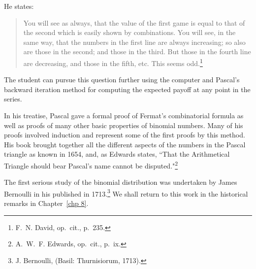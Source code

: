 \noindent He states:
\begin{quote}
\indent You will see as always, that the value of the first game is equal to that of
the second which is easily shown by combinations.  You will see, in the same way, that
the numbers in the first line are always increasing; so also are those in the second;
and those in the third.  But those in the fourth line are decreasing, and those in the
fifth, etc.  This seems odd.\footnote{F.\ N. David, op.\ cit., p.~235.}
\end{quote}
\par The student can pursue this question further using the computer and Pascal's
backward iteration method for computing the expected payoff at any point in the series.
\par In his treatise, Pascal gave a formal proof of Fermat's combinatorial formula as
well as proofs of many other basic properties of binomial numbers.  Many of his proofs
involved induction and represent some of the first proofs by this method.  His book
brought together all the different aspects of the numbers in the Pascal triangle as
known in 1654, and, as Edwards states, ``That the Arithmetical Triangle should bear
Pascal's name cannot be disputed."\footnote{A.~W.~F. Edwards, op.\ cit., p.~ix.}
\par The first serious study of the binomial distribution was undertaken by James Bernoulli
in his  published in 1713.\footnote{J. Bernoulli, 
 (Basil: Thurnisiorum, 1713).}  We shall return to this work in the
historical remarks in Chapter~\ref{chp 8}. 

